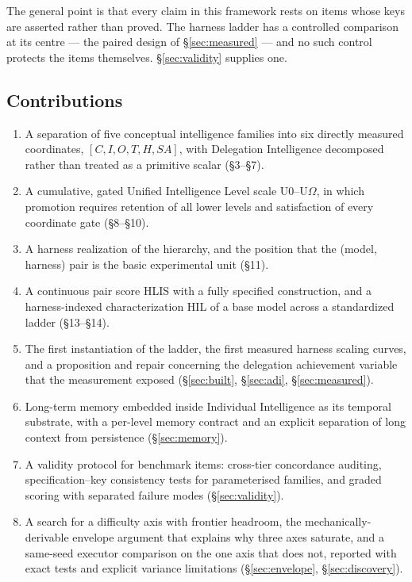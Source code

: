 \documentclass[11pt]{article}
\theoremstyle{definition}
\newcommand{\Om}{\ensuremath{\Omega}}
\begin{document}
The general point is that every claim in this framework rests on items whose keys are asserted rather than proved. The harness ladder has a controlled comparison at its centre --- the paired design of \S\ref{sec:measured} --- and no such control protects the items themselves. \S\ref{sec:validity} supplies one.

\subsection{Contributions}

\begingroup\sloppy
\begin{enumerate}
\item A separation of five conceptual intelligence families into six directly measured coordinates,
      $[C,I,O,T,H,SA]$, with Delegation Intelligence decomposed rather than treated as a primitive scalar (\S3--\S7).
\item A cumulative, gated Unified Intelligence Level scale U0--U\Om{}, in which promotion requires retention of all lower levels and satisfaction of every coordinate gate (\S8--\S10).
\item A harness realization of the hierarchy, and the position that the (model, harness) pair is the basic experimental unit (\S11).
\item A continuous pair score HLIS with a fully specified construction, and a harness-indexed characterization HIL of a base model across a standardized ladder (\S13--\S14).
\item The first instantiation of the ladder, the first measured harness scaling curves, and a proposition and repair concerning the delegation achievement variable that the measurement exposed (\S\ref{sec:built}, \S\ref{sec:adi}, \S\ref{sec:measured}).
\item Long-term memory embedded inside Individual Intelligence as its temporal substrate, with a per-level memory contract and an explicit separation of long context from persistence (\S\ref{sec:memory}).
\item A validity protocol for benchmark items: cross-tier concordance auditing, specification--key consistency tests for parameterised families, and graded scoring with separated failure modes (\S\ref{sec:validity}).
\item A search for a difficulty axis with frontier headroom, the mechanically-derivable envelope argument that explains why three axes saturate, and a same-seed executor comparison on the one axis that does not, reported with exact tests and explicit variance limitations (\S\ref{sec:envelope}, \S\ref{sec:discovery}).
\end{enumerate}
\endgroup
\end{document}
